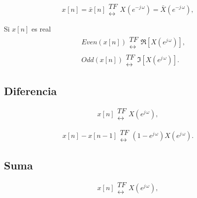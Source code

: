 \begin{equation}
x^{ }\left[ n\right] =\bar{x}\left[ n\right] 
\begin{array}{l}
TF \\ 
\leftrightarrow
\end{array}
X^{ }\left( e^{-j \, \omega }\right) =\bar{X}\left( e^{-j \, \omega }\right) ,
\end{equation}

Si $x\left[ n\right] $ es real 
\begin{eqnarray}
&&Even\left( x\left[ n\right] \right) 
\begin{array}{l}
TF \\ 
\leftrightarrow
\end{array}
\Re\left[ X\left( e^{j \, \omega }\right) \right] , \\
&&Odd\left( x\left[ n\right] \right) 
\begin{array}{l}
TF \\ 
\leftrightarrow
\end{array}
\Im\left[ X\left( e^{j \, \omega }\right) \right] .
\end{eqnarray}

\subsection{Diferencia}

\begin{equation}
x\left[ n\right] 
\begin{array}{l}
TF \\ 
\leftrightarrow
\end{array}
X\left( e^{j \, \omega }\right) ,
\end{equation}

\begin{equation}
x\left[ n\right] -x\left[ n-1\right] 
\begin{array}{l}
TF \\ 
\leftrightarrow
\end{array}
\left( 1-e^{j \, \omega }\right) X\left( e^{j \, \omega }\right).
\end{equation}

\subsection{Suma}

\begin{equation}
x\left[ n\right] 
\begin{array}{l}
TF \\ 
\leftrightarrow
\end{array}
X\left( e^{j \, \omega }\right) ,
\end{equation}

